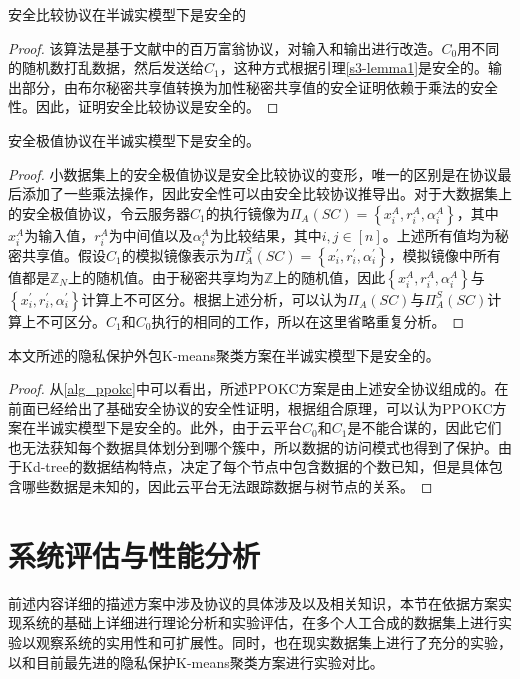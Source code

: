 \begin{theorem}
	安全比较协议在半诚实模型下是安全的
\end{theorem}
\begin{proof}
	该算法是基于文献\cite{rathee2020cryptflow2}中的百万富翁协议，对输入和输出进行改造。$ C_0 $用不同的随机数打乱数据，然后发送给$ C_1 $，这种方式根据引理\ref{s3-lemma1}是安全的。输出部分，由布尔秘密共享值转换为加性秘密共享值的安全证明依赖于乘法的安全性。因此，证明安全比较协议是安全的。
\end{proof}
\begin{theorem}
	安全极值协议在半诚实模型下是安全的。
\end{theorem}
\begin{proof}
	小数据集上的安全极值协议是安全比较协议的变形，唯一的区别是在协议最后添加了一些乘法操作，因此安全性可以由安全比较协议推导出。对于大数据集上的安全极值协议，令云服务器$ C_1 $的执行镜像为$\Pi_A(S C)=\left\{x_i^A, r_i^A, \alpha_i^A\right\}$，其中$ x_i^A $为输入值，$ r_i^A $为中间值以及$ \alpha_i^A $为比较结果，其中$ i,j\in[n] $。上述所有值均为秘密共享值。假设$ C_1 $的模拟镜像表示为$\Pi_A^S(S C)=\left\{x_i^{\prime}, r_i^{\prime}, \alpha_i^{\prime}\right\}$，模拟镜像中所有值都是$ \mathbb{Z}_N $上的随机值。由于秘密共享均为$ \mathbb{Z} $上的随机值，因此$ \left\{x_i^A, r_i^A, \alpha_i^A\right\} $与$ \left\{x_i^{\prime}, r_i^{\prime}, \alpha_i^{\prime}\right\} $计算上不可区分。根据上述分析，可以认为$ \Pi_A(SC) $与$ \Pi_A^S(SC) $计算上不可区分。$ C_1 $和$ C_0 $执行的相同的工作，所以在这里省略重复分析。
\end{proof}
\begin{theorem}
	本文所述的隐私保护外包K-means聚类方案在半诚实模型下是安全的。
\end{theorem}
\begin{proof}
	从\ref{alg_ppokc}中可以看出，所述PPOKC方案是由上述安全协议组成的。在前面已经给出了基础安全协议的安全性证明，根据组合原理\cite{goldreich2004encryption}，可以认为PPOKC方案在半诚实模型下是安全的。此外，由于云平台$ C_0 $和$ C_1 $是不能合谋的，因此它们也无法获知每个数据具体划分到哪个簇中，所以数据的访问模式也得到了保护。由于Kd-tree的数据结构特点，决定了每个节点中包含数据的个数已知，但是具体包含哪些数据是未知的，因此云平台无法跟踪数据与树节点的关系。
\end{proof}
\section{系统评估与性能分析}
\label{s3-shiyan}
前述内容详细的描述方案中涉及协议的具体涉及以及相关知识，本节在依据方案实现系统的基础上详细进行理论分析和实验评估，在多个人工合成的数据集上进行实验以观察系统的实用性和可扩展性。同时，也在现实数据集上进行了充分的实验，以和目前最先进的隐私保护K-means聚类方案\cite{wu2020secure,mohassel2019practical}进行实验对比。
